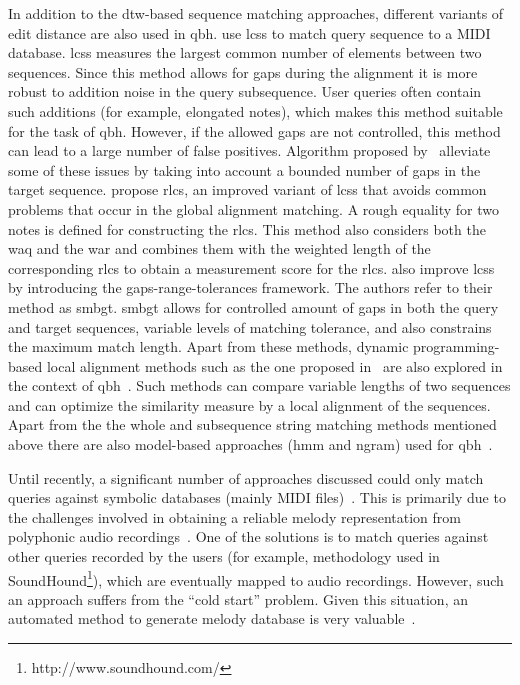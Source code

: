 In addition to the \gls{dtw}-based sequence matching approaches, different variants of edit distance are also used in \gls{qbh}. \cite{uitdenbogerd1999melodic} use \gls{lcss} to match query sequence to a MIDI database. \gls{lcss} measures the largest common number of elements between two sequences. Since this method allows for gaps during the alignment it is more robust to addition noise in the query subsequence. User queries often contain such additions (for example, elongated notes), which makes this method suitable for the task of \gls{qbh}. However, if the allowed gaps are not controlled, this method can lead to a large number of false positives. Algorithm proposed by~\cite{iliopoulos2002string} alleviate some of these issues by taking into account a bounded number of gaps in the target sequence. \cite{lin2011music} propose \gls{rlcs}, an improved variant of \gls{lcss} that avoids common problems that occur in the global alignment matching. A rough equality for two notes is defined for constructing the \gls{rlcs}. This method also considers both the \gls{waq} and the \gls{war} and combines them with the weighted length of the corresponding \gls{rlcs} to obtain a measurement score for the \gls{rlcs}. \cite{kotsifakos2011subsequence} also improve \gls{lcss} by introducing the gaps-range-tolerances framework. The authors refer to their method as \gls{smbgt}. \gls{smbgt} allows for controlled amount of gaps in both the query and target sequences, variable levels of matching tolerance, and also constrains the maximum match length. Apart from these methods, dynamic programming-based local alignment methods such as the one proposed in~\cite{smith1981identification} are also explored in the context of \gls{qbh}~\citep{uitdenbogerd1999melodic}. Such methods can compare variable lengths of two sequences and can optimize the similarity measure by a local alignment of the sequences. Apart from the the whole and subsequence string matching methods mentioned above there are also model-based approaches (\acrshort{hmm} and \acrshort{ngram}) used for \gls{qbh}~\citep{durey2001melody,jang2005continuous,uitdenbogerd1999melodic,dannenberg2007comparative}. 

Until recently, a significant number of approaches discussed could only match queries against symbolic databases (mainly MIDI files)~\citep{kotsifakos2012survey}. This is primarily due to the challenges involved in obtaining a reliable melody representation from polyphonic audio recordings~\citep{salamon2013tonal}. One of the solutions is to match queries against other queries recorded by the users (for example, methodology used in SoundHound\footnote{http://www.soundhound.com/}), which are eventually mapped to audio recordings. However, such an approach suffers from the ``cold start'' problem. Given this situation, an automated method to generate melody database is very valuable~\citep{salamon2013tonal}. 

